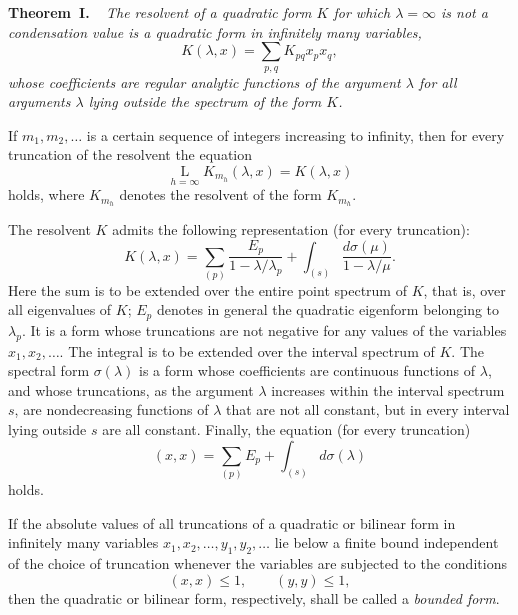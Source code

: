 \documentclass[b5paper,twoside]{article}
\makeatletter
\newcommand{\hilbertstatementname}[2]{%
  \textbf{#1\if\relax\detokenize{#2}\relax\else\ #2\fi.}%
}
\newenvironment{theorem}[1][]{%
  \par\addvspace{.7\baselineskip}%
  \phantomsection
  \protected@edef\@currentlabel{#1}%
  \noindent\hilbertstatementname{Theorem}{#1}\ \itshape\ignorespaces
}{%
  \par\addvspace{.7\baselineskip}%
}
\newcommand{\originalpage}[1]{\phantomsection\label{origpage:#1}}
\makeatother
\begin{document}
\begin{theorem}[I]\label{thm:I}
The resolvent of a quadratic form $K$ for which $\lambda=\infty$ is not a
condensation value is a quadratic form in infinitely many variables,
\[
  K(\lambda,x)=\sum_{p,q}K_{pq}x_p x_q,
\]
whose coefficients are regular analytic functions of the argument $\lambda$
for all arguments $\lambda$ lying outside the spectrum of the form $K$.

If $m_1,m_2,\ldots$ is a certain sequence of integers increasing to infinity,
then for every truncation of the resolvent the equation
\begin{equation}
\tag{41}\label{eq:41}
  \mathop{\mathrm{L}}\limits_{h=\infty}K_{m_h}(\lambda,x)=K(\lambda,x)
\end{equation}
holds, where $K_{m_h}$ denotes the resolvent of the form $K_{m_h}$.

The resolvent $K$ admits the following representation (for every truncation):
\begin{equation}
\tag{42}\label{eq:42}
  K(\lambda,x)
  =\sum_{(p)}\frac{E_p}{1-\lambda/\lambda_p}
  +\int_{(s)}\frac{d\sigma(\mu)}{1-\lambda/\mu}.
\end{equation}
Here the sum is to be extended over the entire point spectrum of $K$, that
is, over all eigenvalues of $K$; $E_p$ denotes in general the quadratic
eigenform belonging to $\lambda_p$.  It is a form whose truncations are not
negative for any values of the variables $x_1,x_2,\ldots$.  The integral is
to be extended over the interval spectrum of $K$.  The spectral form
$\sigma(\lambda)$ is a form whose coefficients are continuous functions of
$\lambda$, and whose truncations, as the argument $\lambda$ increases within
the interval spectrum $s$, are nondecreasing functions of $\lambda$ that are
not all constant, but in every interval lying outside $s$ are all constant.
Finally, the equation (for every truncation)
\begin{equation}
\tag{43}\label{eq:43}
  (x,x)=\sum_{(p)}E_p+\int_{(s)}d\sigma(\lambda)
\end{equation}
holds.
\end{theorem}

\originalpage{176}
If the absolute values of all truncations of a quadratic or bilinear form in
infinitely many variables $x_1,x_2,\ldots,y_1,y_2,\ldots$ lie below a finite
bound independent of the choice of truncation whenever the variables are
subjected to the conditions
\begin{equation}
\tag{44}\label{eq:44}
  (x,x)\le1,\qquad(y,y)\le1,
\end{equation}
then the quadratic or bilinear form, respectively, shall be called a
\emph{bounded form}.
\end{document}
